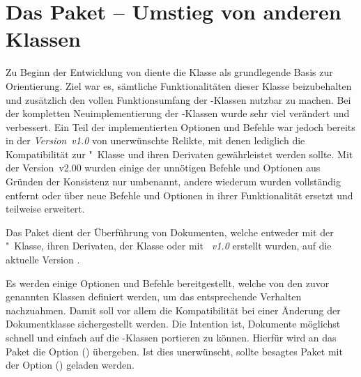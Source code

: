 \section{Das Paket  -- Umstieg von anderen Klassen}
\begin{Bundle*}{}
%
%

\noindent{}

\bigskip\noindent
Zu Beginn der Entwicklung von \TUDScript diente die Klasse  als 
grundlegende Basis zur Orientierung. Ziel war es, sämtliche Funktionalitäten 
dieser Klasse beizubehalten und zusätzlich den vollen Funktionsumfang der 
\KOMAScript-Klassen nutzbar zu machen. Bei der kompletten Neuimplementierung 
der \TUDScript-Klassen wurde sehr viel verändert und verbessert. Ein Teil der 
implementierten Optionen und Befehle war jedoch bereits in der 
\emph{Version~v1.0} von \TUDScript unerwünschte Relikte, mit denen lediglich 
die Kompatibilität zur "~Klasse und ihren Derivaten 
gewährleistet werden sollte. Mit der Version~v2.00 wurden einige der unnötigen 
Befehle und Optionen aus Gründen der Konsistenz nur umbenannt, andere wiederum 
wurden vollständig entfernt oder über neue Befehle und Optionen in ihrer 
Funktionalität ersetzt und teilweise erweitert. 

Das Paket  dient der Überführung von Dokumenten, welche
entweder mit der "~Klasse, ihren Derivaten, 
der Klasse  oder mit \emph{\TUDScript~v1.0} 
erstellt wurden, auf die aktuelle Version \TUDScriptVersion. 

Es werden einige Optionen und Befehle bereitgestellt, welche von den zuvor 
genannten Klassen definiert werden, um das entsprechende Verhalten nachzuahmen. 
Damit soll vor allem die Kompatibilität bei einer Änderung der Dokumentklasse 
sichergestellt werden. Die Intention ist, Dokumente möglichst schnell und 
einfach auf die \TUDScript-Klassen portieren zu können. Hierfür wird an das 
Paket  die Option ()
übergeben. Ist dies unerwünscht, sollte besagtes Paket mit der Option 
() geladen werden.


\end{Bundle*}
